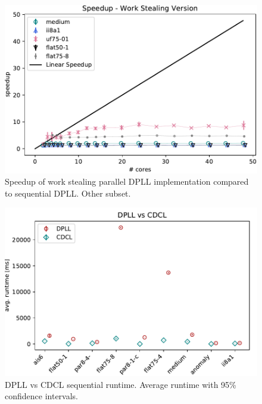 \documentclass[letterpaper]{article}
\begin{document}
\begin{figure}[h]
    \centering
    \includegraphics[width=\columnwidth]{figures/scaling_stealing_non_subset_dpll_scaling_tar.pdf}
    \caption{Speedup of work stealing parallel DPLL implementation compared to sequential DPLL.
    Other subset.}
    \label{fig:dpll_stealing_speedup_non}
\end{figure}

\begin{figure}[h]
    \centering
    \includegraphics[width=\columnwidth]{figures/dpll_vs_cdcl.pdf}
    \caption{DPLL vs CDCL sequential runtime. Average runtime with 95\% confidence intervals.}
    \label{fig:dpll_stealing_speedup_non}
\end{figure}
\end{document}
